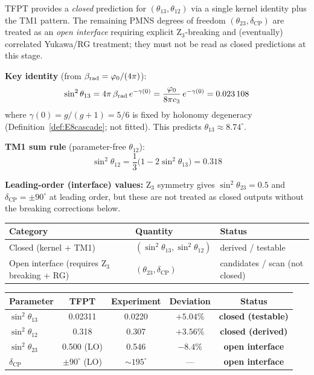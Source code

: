 \begin{tcolorbox}[colback=blue!3, colframe=blue!50!black, 
    title={\textbf{PMNS: closed sub-block vs.\ open interface}}, fonttitle=\bfseries]
TFPT provides a \emph{closed} prediction for $(\theta_{13},\theta_{12})$ via a single kernel identity plus the TM1 pattern. The remaining PMNS degrees of freedom $(\theta_{23},\delta_{\mathrm{CP}})$ are treated as an \emph{open interface} requiring explicit Z$_3$-breaking and (eventually) correlated Yukawa/RG treatment; they must not be read as closed predictions at this stage.

\textbf{Key identity} (from $\beta_{\text{rad}} = \phiz/(4\pi)$):
\begin{equation}
    \sin^2\theta_{13} = 4\pi\,\beta_{\text{rad}}\, e^{-\gamma(0)} 
    = \frac{\phiz}{8\pi\cthree}\, e^{-\gamma(0)} = \num[round-mode=places,round-precision=6]{\TFPTsinSqThetaThirteen}
\end{equation}
where $\gamma(0)=g/(g+1)=5/6$ is fixed by holonomy degeneracy (Definition~\ref{def:E8cascade}; not fitted). 
This predicts $\theta_{13} \approx 8.74^\circ$.

\textbf{TM1 sum rule} (parameter-free $\theta_{12}$):
\begin{equation}
    \sin^2\theta_{12} = \frac{1}{3}\bigl(1 - 2\sin^2\theta_{13}\bigr) = 0.318
\end{equation}

\textbf{Leading-order (interface) values:} Z$_3$ symmetry gives $\sin^2\theta_{23}=0.5$ and $\delta_{\mathrm{CP}}=\pm 90^\circ$ at leading order, but these are not treated as closed outputs without the breaking corrections below.

\medskip
\begin{center}
\begin{tabular}{@{}lll@{}}
\toprule
\textbf{Category} & \textbf{Quantity} & \textbf{Status}\\
\midrule
Closed (kernel + TM1) & $(\sin^2\theta_{13},\sin^2\theta_{12})$ & derived / testable\\
Open interface (requires Z$_3$ breaking + RG) & $(\theta_{23},\delta_{\mathrm{CP}})$ & candidates / scan (not closed)\\
\bottomrule
\end{tabular}
\end{center}

\begin{center}
\begin{tabular}{@{}lcccc@{}}
\toprule
\textbf{Parameter} & \textbf{TFPT} & \textbf{Experiment} & \textbf{Deviation} & \textbf{Status}\\
\midrule
$\sin^2\theta_{13}$ & 0.02311 & 0.0220 & $+5.04\%$ & \textbf{closed (testable)}\\
$\sin^2\theta_{12}$ & 0.318 & 0.307 & $+3.56\%$ & \textbf{closed (derived)}\\
$\sin^2\theta_{23}$ & 0.500 (LO) & 0.546 & $-8.4\%$ & \textbf{open interface}\\
$\delta_{\text{CP}}$ & $\pm 90^\circ$ (LO) & $\sim 195^\circ$ & --- & \textbf{open interface}\\
\bottomrule
\end{tabular}
\end{center}


\end{tcolorbox}
